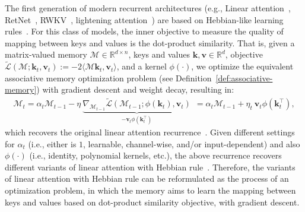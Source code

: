 \documentclass{article}
\newcommand{\vv}{\mathbf{v}}
\newcommand{\citep}{\parencite}
\newcommand{\undermath}[2]{\underset{#1}{\underbrace{#2}}}
\newcommand{\R}[0]{\mathbb{R}}
\newcommand{\inner}[2]{\langle #1, #2 \rangle}
\newcommand{\M}[0]{\mathcal{M}}
\newcommand{\head}[1]{\vspace{1.7mm}\noindent{{\textcolor{c4}{\bf #1.}}}}
\newcommand{\vk}{\boldsymbol{k}}
\renewcommand{\vv}{\boldsymbol{v}}
\begin{document}
{\head{RNNs with Hebbian Rule} The first generation of modern recurrent architectures (e.g., Linear attention~\citep{katharopoulos2020transformers}, RetNet~\citep{sun2023retentive}, RWKV~\citep{peng2023rwkv}, lightening attention~\citep{li2025minimax}) are based on Hebbian-like learning rules~\citep{hebb2005organization}. For this class of models, the inner objective to measure the quality of mapping between keys and values is the dot-product similarity. That is, given a matrix-valued memory $\M \in \R^{d \times n}$, keys and values $\vk, \vv \in \R^{d}$, objective $\tilde{\mathcal{L}}(\M; \vk_t, \vv_t) := -2 \inner{\M \vk_t}{\vv_t} $, and a kernel $\phi(\cdot)$, we optimize the equivalent associative memory optimization problem (see Definition~\ref{def:associative-memory}) with gradient descent and weight decay, resulting in:
\begin{align}\label{eq:hebb-rule}
    \M_t = \alpha_t \M_{t-1} - \eta \: \undermath{-\vv_t \phi\left(\vk_t^{\top} \right)}{\nabla_{\M_{t-1}} \tilde{\mathcal{L}}\left( \M_{t-1}; \phi(\vk_t), \vv_t \right)} \ \: = \alpha_t \M_{t-1} + \eta_t \: \vv_t \phi \left(\vk_t^{\top} \right),
\end{align}
which recovers the original linear attention recurrence~\citep{katharopoulos2020transformers}. Given different settings for $\alpha_t$ (i.e., either is $1$, learnable, channel-wise, and/or input-dependent) and also $\phi(\cdot)$ (i.e., identity, polynomial kernels, etc.), the above recurrence recovers different variants of linear attention with Hebbian rule~\citep{katharopoulos2020transformers, polysketchformer-kacham2024, arora2024simple, sun2023retentive, peng2024eagle, beck2024xlstm}. Therefore, the variants of linear attention with Hebbian rule can be reformulated as the process of an optimization problem, in which the memory aims to learn the mapping between keys and values based on dot-product similarity objective, with gradient descent. 

}
\end{document}
